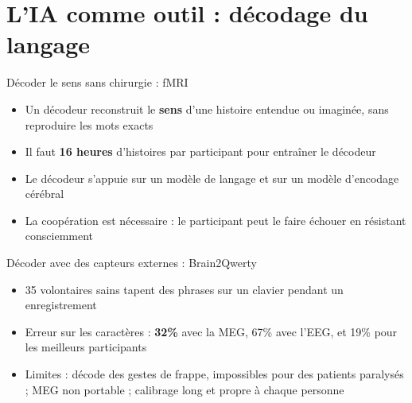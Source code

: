 \section{L'IA comme outil : décodage du langage}

\begin{frame}{Décoder le sens sans chirurgie : fMRI}
\begin{itemize}
    \item Un décodeur reconstruit le \textbf{sens} d'une histoire entendue ou imaginée, sans reproduire les mots exacts
    \item Il faut \textbf{16 heures} d'histoires par participant pour entraîner le décodeur
    \item Le décodeur s'appuie sur un modèle de langage et sur un modèle d'encodage cérébral
    \item La coopération est nécessaire : le participant peut le faire échouer en résistant consciemment
\end{itemize}
\end{frame}

\begin{frame}{Décoder avec des capteurs externes : Brain2Qwerty}
\begin{itemize}
    \item 35 volontaires sains tapent des phrases sur un clavier pendant un enregistrement
    \item Erreur sur les caractères : \textbf{32\%} avec la MEG, 67\% avec l'EEG, et 19\% pour les meilleurs participants
    \item Limites : décode des gestes de frappe, impossibles pour des patients paralysés ; MEG non portable ; calibrage long et propre à chaque personne
\end{itemize}
\end{frame}

